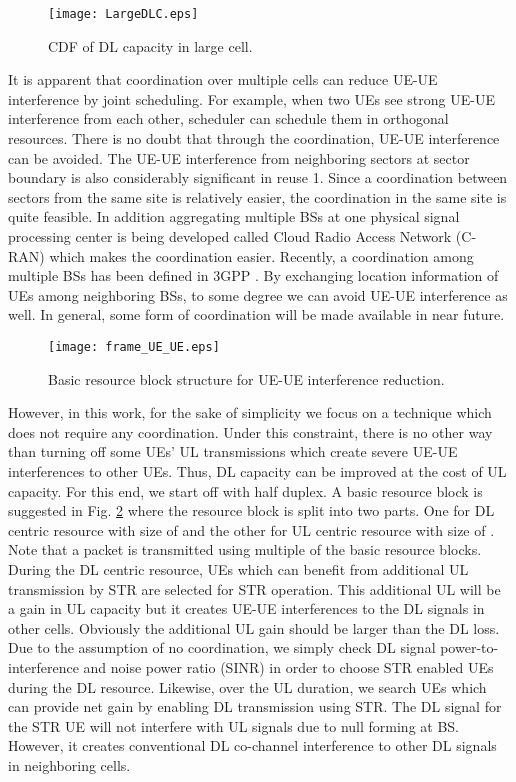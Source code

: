 \documentclass[twocolumn]{IEEEtran}
\begin{document}
\begin{figure}[!t]

\centering
    {\texttt{[image: LargeDLC.eps]}}


\caption{CDF of DL capacity in large cell. \label{LargeDL} }
\end{figure}

It is apparent that coordination over multiple cells can reduce
UE-UE interference by joint scheduling. For example, when two UEs
see strong UE-UE interference from each other, scheduler can
schedule them in orthogonal resources. There is no doubt that
through the coordination, UE-UE interference can be avoided. The
UE-UE interference from neighboring sectors at sector boundary is
also considerably significant in reuse 1. Since a coordination
between sectors from the same site is relatively easier, the
coordination in the same site is quite feasible. In addition
aggregating multiple BSs at one physical signal processing center is
being developed called Cloud Radio Access Network (C-RAN) which
makes the coordination easier. Recently, a coordination among
multiple BSs has been defined in 3GPP \cite{comp}. By exchanging
location information of UEs among neighboring BSs, to some degree we
can avoid UE-UE interference as well. In general, some form of
coordination will be made available in near future.


\begin{figure}[!t]

\centering
    {\texttt{[image: frame\_UE\_UE.eps]}}
\caption{Basic resource block structure for UE-UE interference
reduction. \label{frame_UE_UE} }

\end{figure}

However, in this work, for the sake of simplicity we focus on a
technique which does not require any coordination. Under this
constraint, there is no other way than turning off some UEs' UL
transmissions which create severe UE-UE interferences to other UEs.
Thus, DL capacity can be improved at the cost of UL capacity. For
this end, we start off with half duplex. A basic resource block is
suggested in Fig. \ref{frame_UE_UE} where the resource block is
split into two parts. One for DL centric resource with size of 
and the other for UL centric resource with size of . Note that
a packet is transmitted using multiple of the basic resource blocks.
During the DL centric resource, UEs which can benefit from
additional UL transmission by STR are selected for STR operation.
This additional UL will be a gain in UL capacity but it creates
UE-UE interferences to the DL signals in other cells. Obviously the
additional UL gain should be larger than the DL loss. Due to the
assumption of no coordination, we simply check DL signal
power-to-interference and noise power ratio (SINR) in order to
choose STR enabled UEs during the DL resource. Likewise, over the UL
duration, we search UEs which can provide net gain by enabling DL
transmission using STR. The DL signal for the STR UE will not
interfere with UL signals due to null forming at BS. However, it
creates conventional DL co-channel interference to other DL signals
in neighboring cells.
\end{document}

